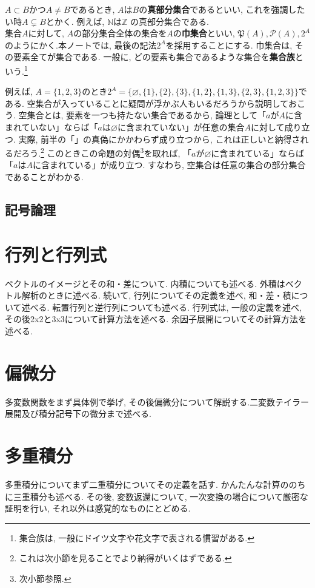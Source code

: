 \documentclass[a4j,dvipdfmx]{jsarticle}
\numberwithin{equation}{section}
\begin{document}
            $A\subset B$かつ$A\neq B$であるとき, $A$は$B$の\textbf{真部分集合}であるといい, これを強調したい時$A\subsetneq B$とかく. 例えば, $\mathbb{N}$は$\mathbb{Z}$
            の真部分集合である.\\

            集合$A$に対して, $A$の部分集合全体の集合を$A$の\textbf{巾集合}といい, $\mathfrak{P}(A), \mathcal{P}(A), 2^{A}$のようにかく.本ノートでは, 最後の記法$2^{A}$を採用することにする.
            巾集合は, その要素全てが集合である. 一般に, どの要素も集合であるような集合を\textbf{集合族}という.\footnote{集合族は, 一般にドイツ文字や花文字で表される慣習がある.}

            例えば, $A=\{1,2,3\}$のとき$2^{A}=\{\varnothing,\{1\},\{2\},\{3\},\{1,2\},\{1,3\},\{2,3\},\{1,2,3\}\}$である. 空集合が入っていることに疑問が浮かぶ人もいるだろうから説明しておこう.
            空集合とは, 要素を一つも持たない集合であるから, 論理として「$a$が$A$に含まれていない」ならば「$a$は$\varnothing$に含まれていない」が任意の集合$A$に対して成り立つ.
            実際, 前半の「」の真偽にかかわらず成り立つから, これは正しいと納得されるだろう.\footnote{これは次小節を見ることでより納得がいくはずである.} 
            このときこの命題の対偶\footnote{次小節参照.}を取れば, 「$a$が$\varnothing$に含まれている」ならば「$a$は$A$に含まれている」が成り立つ.
            すなわち, 空集合は任意の集合の部分集合であることがわかる. 
        \clearpage
        \subsection{記号論理}
    \clearpage
    \section{行列と行列式}
        ベクトルのイメージとその和・差について. 内積についても述べる. 外積はベクトル解析のときに述べる. 続いて, 行列についてその定義を述べ, 和・差・積について述べる.
        転置行列と逆行列についても述べる. 行列式は, 一般の定義を述べ, その後2x2と3x3について計算方法を述べる. 余因子展開についてその計算方法を述べる.
    \clearpage
    \section{偏微分}
        多変数関数をまず具体例で挙げ, その後偏微分について解説する.二変数テイラー展開及び積分記号下の微分まで述べる.
    \clearpage
    \section{多重積分}
        多重積分についてまず二重積分についてその定義を話す. かんたんな計算ののちに三重積分も述べる. その後, 変数返還について, 一次変換の場合について厳密な証明を行い, 
        それ以外は感覚的なものにとどめる.
    \clearpage
    
\end{document}
